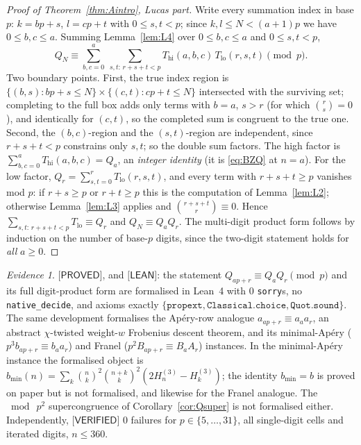 \documentclass[11pt,reqno]{amsart}
\theoremstyle{plain}
\theoremstyle{definition}
\theoremstyle{remark}
\newtheorem{evidence}[theorem]{Evidence}
\numberwithin{equation}{section}
\newcommand{\PROVED}{\textsf{[PROVED]}}
\newcommand{\VERIFIED}{\textsf{[VERIFIED]}}
\newcommand{\LEAN}{\textsf{[LEAN]}}
\begin{document}
\begin{proof}[Proof of Theorem~\textup{\ref{thm:Aintro}}, Lucas part]
Write every summation index in base $p$: $k=bp+s$, $l=cp+t$ with $0\le s,t<p$; since
$k,l\le N<(a+1)p$ we have $0\le b,c\le a$. Summing Lemma~\ref{lem:L4} over
$0\le b,c\le a$ and $0\le s,t<p$,
\[
Q_N\equiv\sum_{b,c=0}^{a}\ \sum_{s,t:\,r+s+t<p}T_{\mathrm{hi}}(a,b,c)\,T_{\mathrm{lo}}(r,s,t)\pmod p .
\]
Two boundary points. First, the true index region is
$\{(b,s):bp+s\le N\}\times\{(c,t):cp+t\le N\}$ intersected with the surviving set; completing
to the full box adds only terms with $b=a$, $s>r$ (for which $\binom{r}{s}=0$), and
identically for $(c,t)$, so the completed sum is congruent to the true one. Second, the
$(b,c)$-region and the $(s,t)$-region are independent, since $r+s+t<p$ constrains only $s,t$;
so the double sum factors. The high factor is $\sum_{b,c=0}^{a}T_{\mathrm{hi}}(a,b,c)=Q_a$, an
\emph{integer identity} (it is \eqref{eq:BZQ} at $n=a$). For the low factor,
$Q_r=\sum_{s,t=0}^{r}T_{\mathrm{lo}}(r,s,t)$, and every term with $r+s+t\ge p$ vanishes mod
$p$: if $r+s\ge p$ or $r+t\ge p$ this is the computation of Lemma~\ref{lem:L2}; otherwise
Lemma~\ref{lem:L3} applies and $\binom{r+s+t}{r}\equiv0$. Hence
$\sum_{s,t:\,r+s+t<p}T_{\mathrm{lo}}\equiv Q_r$ and $Q_N\equiv Q_aQ_r$. The multi-digit
product form follows by induction on the number of base-$p$ digits, since the two-digit
statement holds for \emph{all} $a\ge0$.
\end{proof}

\begin{evidence}\label{ev:A}
$\PROVED$, and $\LEAN$: the statement $Q_{ap+r}\equiv Q_aQ_r\pmod p$ and its full digit-product
form are formalised in Lean~4 with $0$ \texttt{sorry}s, no \texttt{native\_decide}, and axioms
exactly $\{\texttt{propext},\texttt{Classical.choice},\texttt{Quot.sound}\}$. The same
development formalises the Ap\'ery-row analogue $a_{ap+r}\equiv a_aa_r$, an abstract
$\chi$-twisted weight-$w$ Frobenius descent theorem, and its minimal-Ap\'ery
($p^3b_{ap+r}\equiv b_aa_r$) and Franel ($p^2B_{ap+r}\equiv B_aA_r$) instances. In the
minimal-Ap\'ery instance the formalised object is $b_{\min}(n)=\sum_k\binom nk^2\binom{n+k}k^2
(2H^{(3)}_n-H^{(3)}_k)$; the identity $b_{\min}=b$ is proved on paper but is not formalised, and
likewise for the Franel analogue. The $\bmod\ p^2$ supercongruence of
Corollary~\ref{cor:Qsuper} is not formalised either.
Independently, $\VERIFIED$ $0$ failures for $p\in\{5,\dots,31\}$, all single-digit cells and
iterated digits, $n\le360$.
\end{evidence}
\end{document}
